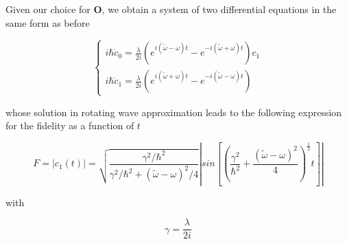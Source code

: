 \documentclass{article}
\begin{document}
Given our choice for \( \bm{O} \), we obtain a system of two differential equations in the same form as before

\begin{equation}
  \begin{cases}
    i\hbar \dot{c}_0 = \frac{\lambda}{2i} \left( e^{i(\tilde{\omega}-\omega)t} - e^{-i(\tilde{\omega}+\omega)t} \right) c_1 \\
    i\hbar \dot{c}_1 = \frac{\lambda}{2i} \left( e^{i(\tilde{\omega}+\omega)t} - e^{-i(\tilde{\omega}-\omega)t} \right)
  \end{cases}
\end{equation}

whose solution in rotating wave approximation leads to the following expression for the fidelity as a function of \(t\)

\begin{equation}
F = |c_1(t)| = \sqrt{\frac{\gamma^2/\hbar^2}{\gamma^2/\hbar^2 + (\tilde{\omega}-\omega)^2/4}} \left| sin \left[\left(\frac{\gamma^2}{\hbar^2} + \frac{(\tilde{\omega}-\omega)^2}{4} \right)^{\frac{1}{2}} t \right] \right|
\end{equation}

with

\begin{equation}
\gamma = \frac{\lambda}{2i}
\end{equation}
\end{document}
